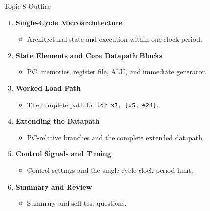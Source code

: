 \documentclass[aspectratio=169,11pt,t]{beamer}
\newcommand{\key}[1]{\textbf{#1}}
\newcommand{\code}[1]{\texttt{#1}}
\begin{document}
\begin{frame}{Topic 8 Outline}
\begin{enumerate}\setlength{\itemsep}{5pt}
  \item \key{Single-Cycle Microarchitecture}
  \begin{itemize}\item Architectural state and execution within one clock period.\end{itemize}
  \item \key{State Elements and Core Datapath Blocks}
  \begin{itemize}\item PC, memories, register file, ALU, and immediate generator.\end{itemize}
  \item \key{Worked Load Path}
  \begin{itemize}\item The complete path for \code{ldr x7, [x5, \#24]}.\end{itemize}
  \item \key{Extending the Datapath}
  \begin{itemize}\item PC-relative branches and the complete extended datapath.\end{itemize}
  \item \key{Control Signals and Timing}
  \begin{itemize}\item Control settings and the single-cycle clock-period limit.\end{itemize}
  \item \key{Summary and Review}
  \begin{itemize}\item Summary and self-test questions.\end{itemize}
\end{enumerate}
\end{frame}
\end{document}
